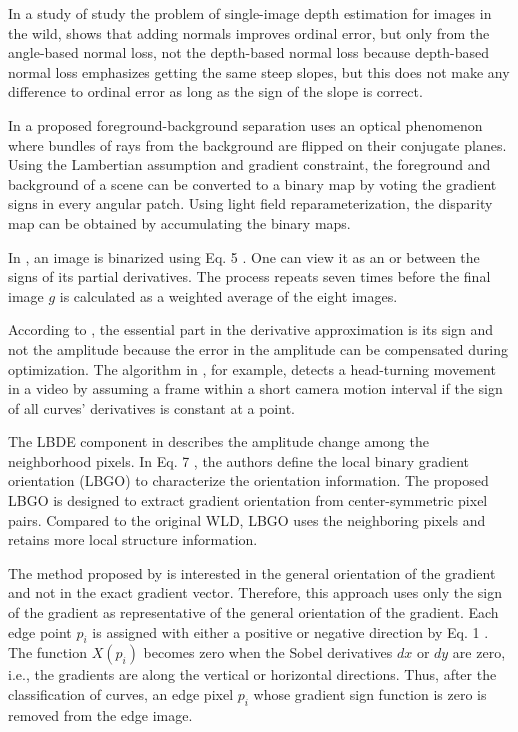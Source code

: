 \documentclass[11pt]{book}
\begin{document}
In a study of study the problem of single-image depth estimation for images in the wild, \cite{chen2017surface} shows that adding normals improves ordinal error,
but only from the angle-based normal loss, not the depth-based normal
loss because depth-based normal loss emphasizes getting the same steep
slopes, but this does not make any difference to ordinal error as
long as the sign of the slope is correct.

In a proposed foreground-background separation \cite{lee2017depth} uses an optical phenomenon where bundles of rays from the background
are flipped on their conjugate planes. Using the Lambertian assumption
and gradient constraint, the foreground and background of a scene
can be converted to a binary map by voting the gradient signs in every
angular patch. Using light field reparameterization, the disparity
map can be obtained by accumulating the binary maps.

In \cite{kuznetsov2017new}, an image is binarized using Eq. 5 . One
can view it as an \textquotedbl or\textquotedbl{} between the signs
of its partial derivatives. The process repeats seven times before
the final image $g$ is calculated as a weighted average of the eight
images.

According to \cite{kudryavtsev2017autofocus}, the essential part
in the derivative approximation is its sign and not the amplitude
because the error in the amplitude can be compensated during optimization. The algorithm in \cite{silva2018weighted}, for example, detects a head-turning
movement in a video by assuming a frame within a short camera motion
interval if the sign of all curves' derivatives is constant at a point.

The LBDE component in \cite{xia2018novel} describes the amplitude
change among the neighborhood pixels. In Eq. 7 , the authors define
the local binary gradient orientation (LBGO) to characterize the orientation
information. The proposed LBGO is designed to extract gradient orientation
from center-symmetric pixel pairs. Compared to the original WLD, LBGO
uses the neighboring pixels and retains more local structure information.

The method proposed by \cite{dong2018accurate} is interested in the
general orientation of the gradient and not in the exact gradient
vector. Therefore, this approach uses only the sign of the gradient
as representative of the general orientation of the gradient. Each
edge point $p_{i}$ is assigned with either a positive or negative
direction by Eq. 1 . The function $X\left(p_{i}\right)$ becomes zero
when the Sobel derivatives $dx$ or $dy$ are zero, i.e., the gradients
are along the vertical or horizontal directions. Thus, after the classification
of curves, an edge pixel $p_{i}$ whose gradient sign function is
zero is removed from the edge image.
\end{document}
